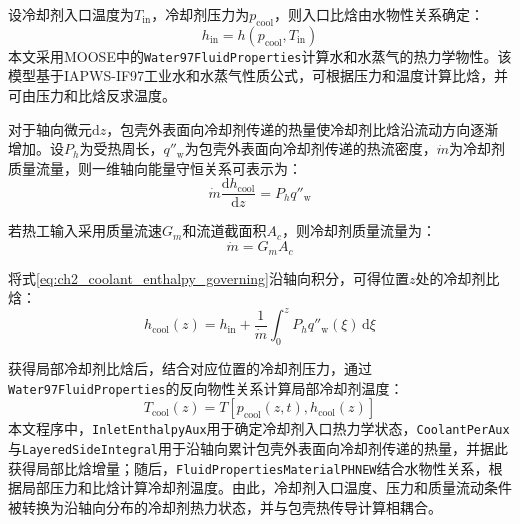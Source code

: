 设冷却剂入口温度为$T_{\mathrm{in}}$，冷却剂压力为$p_{\mathrm{cool}}$，则入口比{\rarecharfont 焓}由水物性关系确定：
\begin{equation}
	h_{\mathrm{in}}
	=h\!\left(p_{\mathrm{cool}},T_{\mathrm{in}}\right)
	\label{eq:ch2_coolant_inlet_enthalpy}
\end{equation}
本文采用MOOSE中的\texttt{Water97FluidProperties}计算水和水蒸气的热力学物性。该模型基于IAPWS-IF97工业水和水蒸气性质公式\cite{wagnerPropertiesWaterSteam1998}，可根据压力和温度计算比{\rarecharfont 焓}，并可由压力和比{\rarecharfont 焓}反求温度。

对于轴向微元$\mathrm dz$，包壳外表面向冷却剂传递的热量使冷却剂比{\rarecharfont 焓}沿流动方向逐渐增加。设$P_h$为受热周长，$q''_{\mathrm w}$为包壳外表面向冷却剂传递的热流密度，$\dot m$为冷却剂质量流量，则一维轴向能量守恒关系可表示为：
\begin{equation}
	\dot m\frac{\mathrm dh_{\mathrm{cool}}}{\mathrm dz}
	=P_hq''_{\mathrm w}
	\label{eq:ch2_coolant_enthalpy_governing}
\end{equation}

若热工输入采用质量流速$G_m$和流道截面积$A_c$，则冷却剂质量流量为：
\begin{equation}
	\dot m=G_mA_c
	\label{eq:ch2_coolant_mass_flow}
\end{equation}

将式\eqref{eq:ch2_coolant_enthalpy_governing}沿轴向积分，可得位置$z$处的冷却剂比{\rarecharfont 焓}：
\begin{equation}
	h_{\mathrm{cool}}(z)
	=h_{\mathrm{in}}
	+\frac{1}{\dot m}
	\int_0^z P_hq''_{\mathrm w}(\xi)\,\mathrm d\xi
	\label{eq:ch2_coolant_enthalpy_integral}
\end{equation}

获得局部冷却剂比{\rarecharfont 焓}后，结合对应位置的冷却剂压力，通过\texttt{Water97FluidProperties}的反向物性关系计算局部冷却剂温度：
\begin{equation}
	T_{\mathrm{cool}}(z)
	=T\!\left[p_{\mathrm{cool}}(z,t),h_{\mathrm{cool}}(z)\right]
	\label{eq:ch2_coolant_temperature_ph}
\end{equation}
本文程序中，\texttt{InletEnthalpyAux}用于确定冷却剂入口热力学状态，\texttt{CoolantPerAux}与\texttt{LayeredSideIntegral}用于沿轴向累计包壳外表面向冷却剂传递的热量，并据此获得局部比{\rarecharfont 焓}增量；随后，\texttt{FluidPropertiesMaterialPHNEW}结合水物性关系，根据局部压力和比{\rarecharfont 焓}计算冷却剂温度。由此，冷却剂入口温度、压力和质量流动条件被转换为沿轴向分布的冷却剂热力状态，并与包壳热传导计算相耦合。

